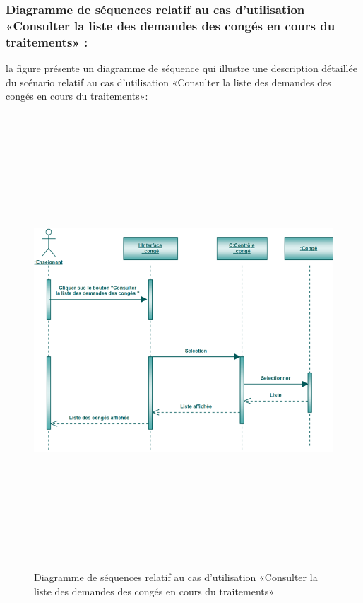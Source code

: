 \documentclass[12 pt]{report}
\begin{document}
\subsubsection{Diagramme de séquences relatif au cas d’utilisation «Consulter la liste des demandes des congés en cours du traitements» :}
la figure   présente un diagramme de séquence qui illustre une description détaillée du scénario relatif au cas d’utilisation «Consulter la liste des demandes des congés en cours du traitements»: 
\begin{figure}[h]
 \begin{center}
\includegraphics[width= 18 cm ,height=  17cm]{scc.PNG}
\caption{Diagramme de séquences relatif au cas d’utilisation «Consulter la liste des demandes des congés en cours du traitements»}

\end{center}
\end{figure}
\end{document}
